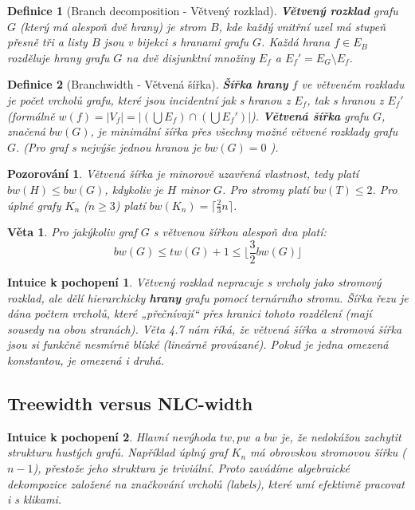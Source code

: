 \documentclass[a4paper,11pt]{article}
\newtheorem{definition}{Definice}[section]
\newtheorem{theorem}{Věta}[section]
\newtheorem{observation}{Pozorování}[section]
\newtheorem*{intuition}{Intuice k pochopení}
\begin{document}
\begin{definition}[Branch decomposition - Větvený rozklad]
\textbf{Větvený rozklad} grafu $G$ (který má alespoň dvě hrany) je strom $B$, kde každý vnitřní uzel má stupeň přesně tři a listy $B$ jsou v bijekci s hranami grafu $G$.
Každá hrana $f \in E_B$ rozděluje hrany grafu $G$ na dvě disjunktní množiny $E_f$ a $E_f' = E_G \setminus E_f$.
\end{definition}

\begin{definition}[Branchwidth - Větvená šířka]
\textbf{Šířka hrany} $f$ ve větveném rozkladu je počet vrcholů grafu, které jsou incidentní jak s hranou z $E_f$, tak s hranou z $E_f'$ (formálně $w(f) = |V_f| = |(\bigcup E_f) \cap (\bigcup E_f')|$). 
\textbf{Větvená šířka} grafu $G$, značená $bw(G)$, je minimální šířka přes všechny možné větvené rozklady grafu $G$. (Pro graf s nejvýše jednou hranou je $bw(G) = 0$ ).
\end{definition}

\begin{observation}
Větvená šířka je minorově uzavřená vlastnost, tedy platí $bw(H) \le bw(G)$, kdykoliv je $H$ minor $G$. Pro stromy platí $bw(T) \le 2$. Pro úplné grafy $K_n$ ($n \ge 3$) platí $bw(K_n) = \lceil \frac{2}{3}n \rceil$.
\end{observation}

\begin{theorem}
Pro jakýkoliv graf $G$ s větvenou šířkou alespoň dva platí:
$$bw(G) \le tw(G) + 1 \le \lfloor \frac{3}{2}bw(G) \rfloor$$
\end{theorem}

\begin{intuition}
Větvený rozklad nepracuje s vrcholy jako stromový rozklad, ale dělí hierarchicky \textbf{hrany} grafu pomocí ternárního stromu. Šířka řezu je dána počtem vrcholů, které „přečnívají“ přes hranici tohoto rozdělení (mají sousedy na obou stranách). Věta 4.7 nám říká, že větvená šířka a stromová šířka jsou si funkčně nesmírně blízké (lineárně provázané). Pokud je jedna omezená konstantou, je omezená i druhá.
\end{intuition}

\subsection{Treewidth versus NLC-width}

\begin{intuition}
Hlavní nevýhoda $tw, pw$ a $bw$ je, že nedokážou zachytit strukturu hustých grafů. Například úplný graf $K_n$ má obrovskou stromovou šířku ($n-1$), přestože jeho struktura je triviální. Proto zavádíme algebraické dekompozice založené na značkování vrcholů (labels), které umí efektivně pracovat i s klikami.
\end{intuition}
\end{document}
